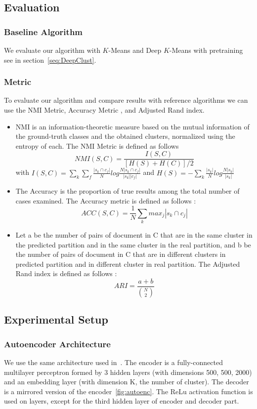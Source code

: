 \subsection{Evaluation}
\subsubsection{Baseline Algorithm}
We evaluate our algorithm with $K$-Means and Deep $K$-Means with pretraining 
see in section~\ref{seq:DeepClust}.
\subsubsection{Metric}
To evaluate our algorithm and compare results with reference algorithms we can
use the NMI Metric, Accuracy Metric \cite{NMI_ACC}, and Adjusted
Rand index\cite{ARI}. 
\begin{itemize}
\item NMI is an information-theoretic measure based on the mutual information of the ground-truth classes
and the obtained clusters, normalized using the entropy of each. The NMI Metric is defined as follows
$$NMI(S,C) = \frac{I(S,C)}{[H(S)+H(C)]/2}$$ 
with
$I(S,C) =\sum\limits_k \sum\limits_f\frac{|s_k \cap c_f|}{N}log\frac{N|s_k \cap c_f|}{|s_k| |c_f|}$
and
$H(S) = -\sum\limits_k\frac{|s_k|}{N}log\frac{N|s_k|}{|s_k|}$
\item The Accuracy is the proportion of true results among the total
  number of cases examined. The Accuracy metric is defined as follows :
$$
ACC(S,C) = \frac{1}{N}\sum\limits_k {max}_j|s_k \cap c_j|
$$
\item Let a be the number of pairs of document in C
  that are in the same cluster in the predicted partition and in the
  same cluster in the real partition, and b be the number of pairs of
  document in C that are in different clusters in predicted partition
  and in different cluster in real partition.
  The Adjusted Rand index is defined as follows :
  $$ARI = \frac{a+b}{\binom{N}{2}}$$
\end{itemize}
\subsection{Experimental Setup}
\subsubsection{Autoencoder Architecture}
We use the same architecture used in~\cite{Deap-K-Means}. The encoder is a fully-connected 
multilayer perceptron formed by 3 hidden layers (with dimensions 500, 500, 2000) 
and an embedding layer (with dimension K, the number of cluster). 
The decoder is a mirrored version of the encoder~\ref{fig:autoenc}.
The ReLu activation function is used on layers, except for the third
hidden layer of encoder and decoder part.
 

